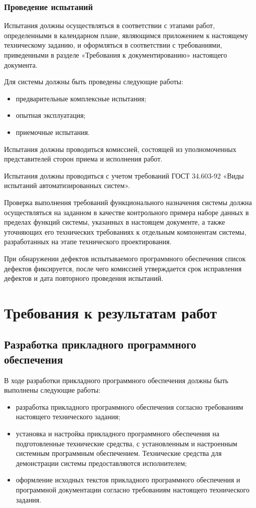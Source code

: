 \documentclass[14pt]{extreport}
\begin{document}
\subsection{Проведение испытаний}

Испытания должны осуществляться в соответствии с этапами работ,
определенными в календарном плане, являющимся приложением к настоящему
техническому заданию, и оформляться в соответствии с требованиями,
приведенными в разделе «Требования к документированию» настоящего
документа.

Для системы должны быть проведены следующие работы:
\begin{itemize}
\item предварительные комплексные испытания;
\item опытная эксплуатация;
\item приемочные испытания.
\end{itemize}

Испытания должны проводиться комиссией, состоящей из
уполномоченных представителей сторон приема и исполнения работ.

Испытания должны проводиться с учетом требований ГОСТ 34.603-92
«Виды испытаний автоматизированных систем».

Проверка выполнения требований функционального назначения системы
должна осуществляться на заданном в качестве контрольного примера наборе
данных в пределах функций системы, указанных в настоящем документе, а
также уточняющих его технических требованиях к отдельным компонентам
системы, разработанных на этапе технического проектирования.

При обнаружении дефектов испытываемого программного обеспечения
список дефектов фиксируется, после чего комиссией утверждается срок
исправления дефектов и дата повторного проведения испытаний.

\chapter{Требования к результатам работ}

\section{Разработка прикладного программного обеспечения}

В ходе разработки прикладного программного обеспечения должны быть
выполнены следующие работы:
\begin{itemize}
\item разработка прикладного программного обеспечения согласно
требованиям настоящего технического задания;
\item установка и настройка прикладного программного обеспечения на
подготовленные технические средства, с установленным и настроенным
системным программным обеспечением. Технические средства для
демонстрации системы предоставляются исполнителем;
\item оформление исходных текстов прикладного программного обеспечения
и программной документации согласно требованиям настоящего
технического задания.
\end{itemize}
\end{document}
